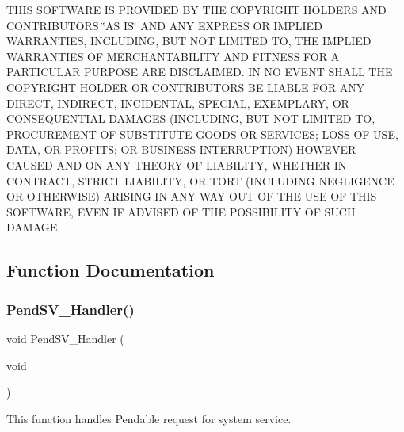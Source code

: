 T\+H\+IS S\+O\+F\+T\+W\+A\+RE IS P\+R\+O\+V\+I\+D\+ED BY T\+HE C\+O\+P\+Y\+R\+I\+G\+HT H\+O\+L\+D\+E\+RS A\+ND C\+O\+N\+T\+R\+I\+B\+U\+T\+O\+RS \char`\"{}\+A\+S I\+S\char`\"{} A\+ND A\+NY E\+X\+P\+R\+E\+SS OR I\+M\+P\+L\+I\+ED W\+A\+R\+R\+A\+N\+T\+I\+ES, I\+N\+C\+L\+U\+D\+I\+NG, B\+UT N\+OT L\+I\+M\+I\+T\+ED TO, T\+HE I\+M\+P\+L\+I\+ED W\+A\+R\+R\+A\+N\+T\+I\+ES OF M\+E\+R\+C\+H\+A\+N\+T\+A\+B\+I\+L\+I\+TY A\+ND F\+I\+T\+N\+E\+SS F\+OR A P\+A\+R\+T\+I\+C\+U\+L\+AR P\+U\+R\+P\+O\+SE A\+RE D\+I\+S\+C\+L\+A\+I\+M\+ED. IN NO E\+V\+E\+NT S\+H\+A\+LL T\+HE C\+O\+P\+Y\+R\+I\+G\+HT H\+O\+L\+D\+ER OR C\+O\+N\+T\+R\+I\+B\+U\+T\+O\+RS BE L\+I\+A\+B\+LE F\+OR A\+NY D\+I\+R\+E\+CT, I\+N\+D\+I\+R\+E\+CT, I\+N\+C\+I\+D\+E\+N\+T\+AL, S\+P\+E\+C\+I\+AL, E\+X\+E\+M\+P\+L\+A\+RY, OR C\+O\+N\+S\+E\+Q\+U\+E\+N\+T\+I\+AL D\+A\+M\+A\+G\+ES (I\+N\+C\+L\+U\+D\+I\+NG, B\+UT N\+OT L\+I\+M\+I\+T\+ED TO, P\+R\+O\+C\+U\+R\+E\+M\+E\+NT OF S\+U\+B\+S\+T\+I\+T\+U\+TE G\+O\+O\+DS OR S\+E\+R\+V\+I\+C\+ES; L\+O\+SS OF U\+SE, D\+A\+TA, OR P\+R\+O\+F\+I\+TS; OR B\+U\+S\+I\+N\+E\+SS I\+N\+T\+E\+R\+R\+U\+P\+T\+I\+ON) H\+O\+W\+E\+V\+ER C\+A\+U\+S\+ED A\+ND ON A\+NY T\+H\+E\+O\+RY OF L\+I\+A\+B\+I\+L\+I\+TY, W\+H\+E\+T\+H\+ER IN C\+O\+N\+T\+R\+A\+CT, S\+T\+R\+I\+CT L\+I\+A\+B\+I\+L\+I\+TY, OR T\+O\+RT (I\+N\+C\+L\+U\+D\+I\+NG N\+E\+G\+L\+I\+G\+E\+N\+CE OR O\+T\+H\+E\+R\+W\+I\+SE) A\+R\+I\+S\+I\+NG IN A\+NY W\+AY O\+UT OF T\+HE U\+SE OF T\+H\+IS S\+O\+F\+T\+W\+A\+RE, E\+V\+EN IF A\+D\+V\+I\+S\+ED OF T\+HE P\+O\+S\+S\+I\+B\+I\+L\+I\+TY OF S\+U\+CH D\+A\+M\+A\+GE. 

\subsection{Function Documentation}
\mbox{\label{stm32f3xx__it_8c_a6303e1f258cbdc1f970ce579cc015623}} 
\subsubsection{Pend\+S\+V\+\_\+\+Handler()}
{\footnotesize\ttfamily void Pend\+S\+V\+\_\+\+Handler (\begin{DoxyParamCaption}\item[{void}]{ }\end{DoxyParamCaption})}



This function handles Pendable request for system service. 


